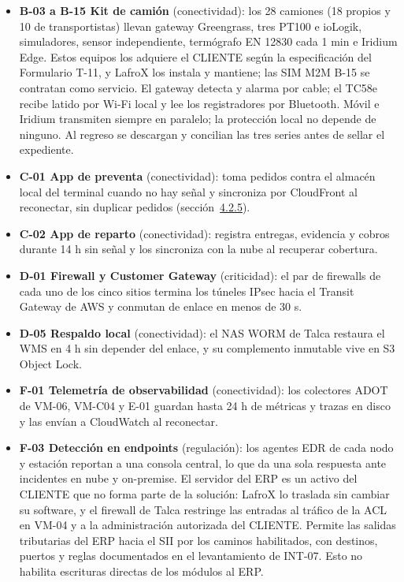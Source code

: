 \begin{itemize}
  \item \textbf{B-03 a B-15 Kit de camión} (conectividad): los 28 camiones (18 propios y 10 de transportistas) llevan gateway Greengrass, tres PT100 e ioLogik, simuladores, sensor independiente, termógrafo EN 12830 cada 1 min e Iridium Edge. Estos equipos los adquiere el CLIENTE según la especificación del Formulario T-11, y LafroX los instala y mantiene; las SIM M2M B-15 se contratan como servicio. El gateway detecta y alarma por cable; el TC58e recibe latido por Wi-Fi local y lee los registradores por Bluetooth. Móvil e Iridium transmiten siempre en paralelo; la protección local no depende de ninguno. Al regreso se descargan y concilian las tres series antes de sellar el expediente.
  \item \textbf{C-01 App de preventa} (conectividad): toma pedidos contra el almacén local del terminal cuando no hay señal y sincroniza por CloudFront al reconectar, sin duplicar pedidos (sección~\href{LAFROX-Subdocumento4.pdf#fuente-02-c-conexiones}{4.2.5}).
  \item \textbf{C-02 App de reparto} (conectividad): registra entregas, evidencia y cobros durante 14 h sin señal y los sincroniza con la nube al recuperar cobertura.
  \item \textbf{D-01 Firewall y Customer Gateway} (criticidad): el par de firewalls de cada uno de los cinco sitios termina los túneles IPsec hacia el Transit Gateway de AWS y conmutan de enlace en menos de 30 s.
  \item \textbf{D-05 Respaldo local} (conectividad): el NAS WORM de Talca restaura el WMS en 4 h sin depender del enlace, y su complemento inmutable vive en S3 Object Lock.
  \item \textbf{F-01 Telemetría de observabilidad} (conectividad): los colectores ADOT de VM-06, VM-C04 y E-01 guardan hasta 24 h de métricas y trazas en disco y las envían a CloudWatch al reconectar.
  \item \textbf{F-03 Detección en endpoints} (regulación): los agentes EDR de cada nodo y estación reportan a una consola central, lo que da una sola respuesta ante incidentes en nube y on-premise. El servidor del ERP es un activo del CLIENTE que no forma parte de la solución: LafroX lo traslada sin cambiar su software, y el firewall de Talca restringe las entradas al tráfico de la ACL en VM-04 y a la administración autorizada del CLIENTE. Permite las salidas tributarias del ERP hacia el SII por los caminos habilitados, con destinos, puertos y reglas documentados en el levantamiento de INT-07. Esto no habilita escrituras directas de los módulos al ERP.
\end{itemize}


